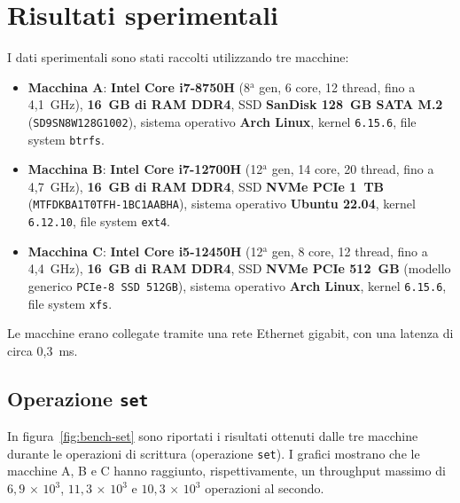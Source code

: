 \section{Risultati sperimentali}
\label{sec:risultati}

I dati sperimentali sono stati raccolti utilizzando tre macchine:
\begin{itemize}
    \item \textbf{Macchina A}: \textbf{Intel Core i7-8750H} (8$^\text{a}$ gen, 6 core, 12 thread, fino a 4{,}1~GHz), \textbf{16~GB di RAM DDR4}, SSD \textbf{SanDisk 128~GB SATA M.2} (\texttt{SD9SN8W128G1002}), sistema operativo \textbf{Arch Linux}, kernel \texttt{6.15.6}, file system \texttt{btrfs}.
    \item \textbf{Macchina B}: \textbf{Intel Core i7-12700H} (12$^\text{a}$ gen, 14 core, 20 thread, fino a 4{,}7~GHz), \textbf{16~GB di RAM DDR4}, SSD \textbf{NVMe PCIe 1~TB} (\texttt{MTFDKBA1T0TFH-1BC1AABHA}), sistema operativo \textbf{Ubuntu 22.04}, kernel \texttt{6.12.10}, file system \texttt{ext4}.
    \item \textbf{Macchina C}: \textbf{Intel Core i5-12450H} (12$^\text{a}$ gen, 8 core, 12 thread, fino a 4{,}4~GHz), \textbf{16~GB di RAM DDR4}, SSD \textbf{NVMe PCIe 512~GB} (modello generico \texttt{PCIe-8 SSD 512GB}), sistema operativo \textbf{Arch Linux}, kernel \texttt{6.15.6}, file system \texttt{xfs}.
\end{itemize}

Le macchine erano collegate tramite una rete Ethernet gigabit, con una latenza di circa 0{,}3~ms.

\subsection{Operazione \texttt{set}}
\label{subsec:risultati-set}

In figura~\ref{fig:bench-set} sono riportati i risultati ottenuti dalle tre macchine durante le operazioni di scrittura (operazione \texttt{set}).
I grafici mostrano che le macchine A, B e C hanno raggiunto, rispettivamente, un throughput massimo di $6{,}9\,{\times}\,10^3$, $11{,}3\,{\times}\,10^3$ e $10{,}3\,{\times}\,10^3$ operazioni al secondo.

